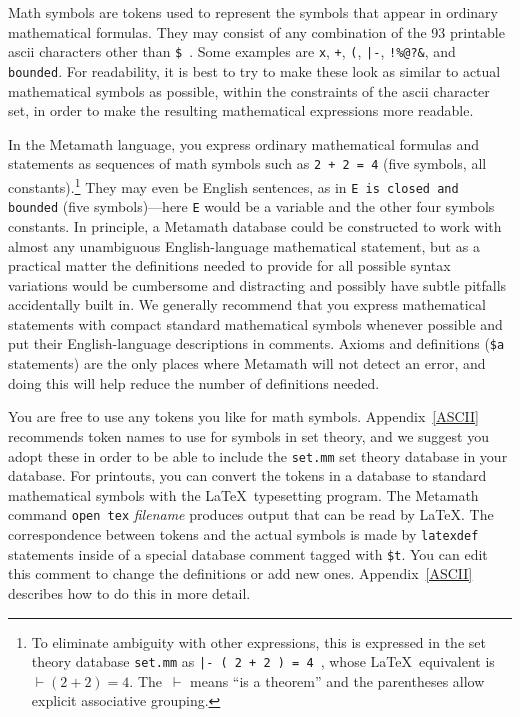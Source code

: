 Math symbols are tokens used to represent the symbols
that appear in ordinary mathematical formulas.  They may consist of any
combination of the 93 printable {\sc ascii} characters other than
\texttt{\$}~. Some examples are \texttt{x}, \texttt{+}, \texttt{(},
\texttt{|-}, \verb$!%@?&$, and \texttt{bounded}.  For readability, it is
best to try to make these look as similar to actual mathematical symbols
as possible, within the constraints of the {\sc ascii} character set, in
order to make the resulting mathematical expressions more readable.

In the Metamath language, you express ordinary
mathematical formulas and statements as sequences of math symbols such
as \texttt{2 + 2 = 4} (five symbols, all constants).\footnote{To
eliminate ambiguity with other expressions, this is expressed in the set
theory database \texttt{set.mm} as \texttt{|- ( 2 + 2
 ) = 4 }, whose \LaTeX\ equivalent is $\vdash
(2+2)=4$.  The \,$\vdash$ means ``is a theorem'' and the
parentheses allow explicit associative grouping.} They may even be English
sentences, as in \texttt{E is closed and bounded} (five symbols)---here
\texttt{E} would be a variable and the other four symbols constants.  In
principle, a Metamath database could be constructed to work with almost
any unambiguous English-language mathematical statement, but as a
practical matter the definitions needed to provide for all possible
syntax variations would be cumbersome and distracting and possibly have
subtle pitfalls accidentally built in.  We generally recommend that you
express mathematical statements with compact standard mathematical
symbols whenever possible and put their English-language descriptions in
comments.  Axioms and definitions
(\texttt{\$a} statements) are the only
places where Metamath will not detect an error, and doing this will help
reduce the number of definitions needed.

You are free to use any tokens you like for math
symbols.  Appendix~\ref{ASCII} recommends token names to
use for symbols in set theory, and we suggest you adopt these in order to be
able to include the \texttt{set.mm} set theory database in your database.  For
printouts, you can convert the tokens in a database
to standard mathematical symbols with the \LaTeX\ typesetting program.  The
Metamath command \texttt{open tex} {\em filename}
produces output that can be read by \LaTeX.
The correspondence
between tokens and the actual symbols is made by \texttt{latexdef}
statements inside of a special database comment tagged
with \texttt{\$t}.
  You can edit
this comment to change the definitions or add new ones.
Appendix~\ref{ASCII} describes how to do this in more detail.

